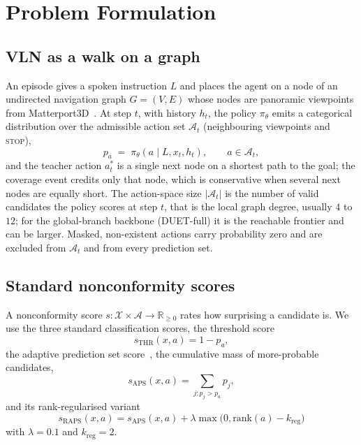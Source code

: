 \section{Problem Formulation}
\label{sec:problem}

\subsection{VLN as a walk on a graph}
An episode gives a spoken instruction $L$ and places the agent on a node of
an undirected navigation graph $G = (V, E)$ whose nodes are panoramic
viewpoints from Matterport3D~\cite{chang2017matterport}. At step $t$, with history $h_t$, the policy $\pi_\theta$ emits a
categorical distribution over the admissible action set $\mathcal{A}_t$
(neighbouring viewpoints and \textsc{stop}),
\begin{equation}
p_a \;=\; \pi_\theta(a \mid L, x_t, h_t), \qquad a \in \mathcal{A}_t,
\label{eq:policy}
\end{equation}
and the teacher action $a^*_t$ is a single next node on a shortest path to the
goal; the coverage event credits only that node, which is conservative when
several next nodes are equally short. The action-space size $|\mathcal{A}_t|$
is the number of valid candidates the policy scores at step $t$, that is the
local graph degree, usually $4$ to $12$; for the global-branch backbone
(DUET-full) it is the reachable frontier and can be larger. Masked,
non-existent actions carry probability zero and are excluded from
$\mathcal{A}_t$ and from every prediction set.

\subsection{Standard nonconformity scores}
A nonconformity score $s : \mathcal{X}\times\mathcal{A}\to\mathbb{R}_{\geq
0}$ rates how surprising a candidate is. We use the three standard
classification scores, the threshold score~\cite{sadinle2019least}
\begin{equation}
s_{\mathrm{THR}}(x,a) = 1 - p_a,
\label{eq:thr}
\end{equation}
the adaptive prediction set score~\cite{romano2020aps}, the cumulative mass
of more-probable candidates,
\begin{equation}
s_{\mathrm{APS}}(x,a) = \textstyle\sum_{j : p_j > p_a} p_j,
\label{eq:aps}
\end{equation}
and its rank-regularised variant~\cite{angelopoulos2021raps}
\begin{equation}
s_{\mathrm{RAPS}}(x,a) = s_{\mathrm{APS}}(x,a)
  + \lambda\max\!\big(0, \mathrm{rank}(a) - k_{\mathrm{reg}}\big)
\label{eq:raps}
\end{equation}
with $\lambda = 0.1$ and $k_{\mathrm{reg}} = 2$.

